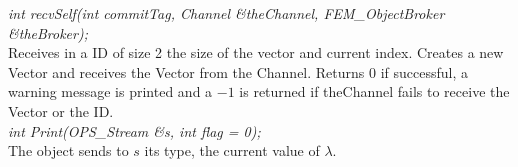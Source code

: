 {\em int recvSelf(int commitTag, Channel \&theChannel, 
FEM\_ObjectBroker \&theBroker); } \\ 
Receives in a ID of size 2 the size of the vector and current index.
Creates a new Vector and receives the Vector from the Channel. 
Returns $0$ if successful, a warning message is printed and a $-1$ is
returned if \p theChannel fails to receive the Vector or the ID.\\

{\em int Print(OPS\_Stream \&s, int flag = 0);}\\
The object sends to $s$ its type, the current value of $\lambda$.
